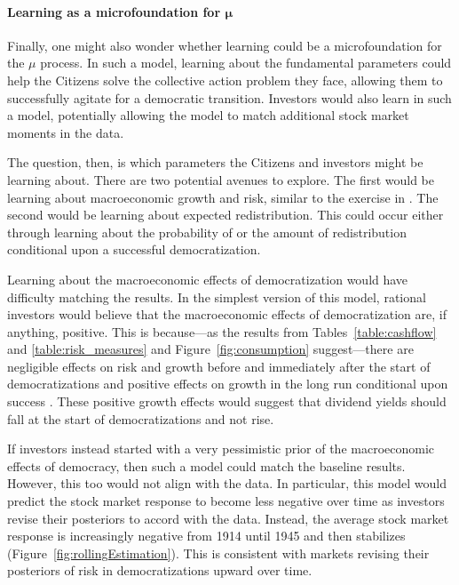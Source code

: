 \documentclass[12pt]{article}
\numberwithin{equation}{section}
\begin{document}
\paragraph{Learning as a microfoundation for $\boldsymbol \mu$}
\label{par:learning_about_dem}
Finally, one might also wonder whether learning could be a microfoundation for the $\mu$ process.  In such a model, learning about the fundamental parameters could help the Citizens solve the collective action problem they face, allowing them to successfully agitate for a democratic transition. Investors would also learn in such a model, potentially allowing the model to match additional stock market moments in the data.

The question, then, is which parameters the Citizens and investors might be learning about. There are two potential avenues to explore. The first would be learning about macroeconomic growth and risk, similar to the exercise in \cite{Buera2011}. The second would be learning about expected redistribution. This could occur either through learning about the probability of or the amount of redistribution conditional upon a successful democratization.

Learning about the macroeconomic effects of democratization would have difficulty matching the results. In the simplest version of this model, rational investors would believe that the macroeconomic effects of democratization are, if anything, positive.  This is because---as the results from Tables~\ref{table:cashflow} and \ref{table:risk_measures} and Figure~\ref{fig:consumption} suggest---there are negligible effects on risk and growth before and immediately after the start of democratizations and positive effects on growth in the long run conditional upon success \citep{Acemoglu2019}.  These positive growth effects would suggest that dividend yields should fall at the start of democratizations and not rise. 

If investors instead started with a very pessimistic prior of the macroeconomic effects of democracy, then such a model could match the baseline results. However, this too would not align with the data. In particular, this model would predict the stock market response to become less negative over time as investors revise their posteriors to accord with the data. Instead, the average stock market response is increasingly negative from 1914 until 1945 and then stabilizes (Figure~\ref{fig:rollingEstimation}). This is consistent with markets revising their posteriors of risk in democratizations upward over time.
\end{document}
